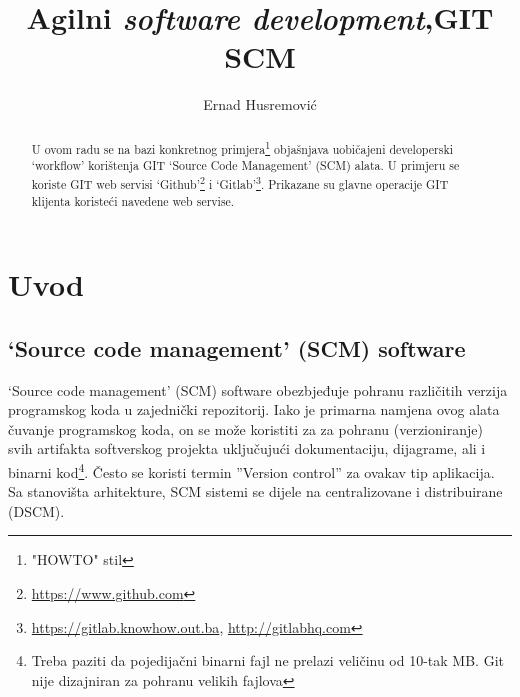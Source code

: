 \documentclass[times, utf8, seminar]{fit}
\begin{document}



\title{Agilni \emph{software development},\newline GIT SCM}

\author{Ernad Husremović}


\maketitle

\tableofcontents

\newpage

\begin{abstract}

U ovom radu se na bazi konkretnog primjera\footnote{"HOWTO" stil} objašnjava uobičajeni developerski `workflow' korištenja GIT `Source Code Management' (SCM) alata. 
U primjeru se koriste GIT web servisi `Github'\footnote{\url{https://www.github.com}} i `Gitlab'\footnote{\url{https://gitlab.knowhow.out.ba}, \url{http://gitlabhq.com}}.
Prikazane su glavne operacije GIT klijenta koristeći navedene web servise.


\end{abstract}


\chapter{Uvod}

\vspace*{-1.2cm}
\section{`Source code management' (SCM) software}

`Source code management' (SCM) software obezbjeđuje pohranu različitih verzija programskog koda u zajednički repozitorij. 
Iako je primarna namjena ovog alata čuvanje programskog koda, on se može koristiti za za pohranu (verzioniranje) svih artifakta softverskog projekta uključujući dokumentaciju, dijagrame, ali i binarni kod\footnote{Treba paziti da pojedijačni binarni fajl ne prelazi veličinu od 10-tak MB. Git nije dizajniran za pohranu velikih fajlova}. Često se koristi termin ''Version control'' za ovakav tip aplikacija.
Sa stanovišta arhitekture, SCM sistemi se dijele na centralizovane i distribuirane (DSCM).
\end{document}

